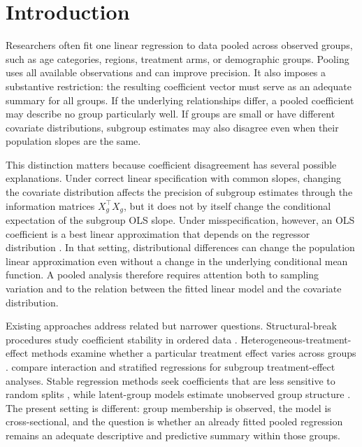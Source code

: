 \section{Introduction}\label{sec:introduction}

Researchers often fit one linear regression to data pooled across observed groups, such as age categories, regions, treatment arms, or demographic groups. Pooling uses all available observations and can improve precision. It also imposes a substantive restriction: the resulting coefficient vector must serve as an adequate summary for all groups. If the underlying relationships differ, a pooled coefficient may describe no group particularly well. If groups are small or have different covariate distributions, subgroup estimates may also disagree even when their population slopes are the same.

This distinction matters because coefficient disagreement has several possible explanations. Under correct linear specification with common slopes, changing the covariate distribution affects the precision of subgroup estimates through the information matrices $X_g^\top X_g$, but it does not by itself change the conditional expectation of the subgroup OLS slope. Under misspecification, however, an OLS coefficient is a best linear approximation that depends on the regressor distribution \citep{berk2019}. In that setting, distributional differences can change the population linear approximation even without a change in the underlying conditional mean function. A pooled analysis therefore requires attention both to sampling variation and to the relation between the fitted linear model and the covariate distribution.

Existing approaches address related but narrower questions. Structural-break procedures study coefficient stability in ordered data \citep{garbade1977,watsenengle1985}. Heterogeneous-treatment-effect methods examine whether a particular treatment effect varies across groups \citep{hte_ref}. \citet{tsoi2026} compare interaction and stratified regressions for subgroup treatment-effect analyses. Stable regression methods seek coefficients that are less sensitive to random splits \citep{bertsimas2020}, while latent-group models estimate unobserved group structure \citep{liu2020}. The present setting is different: group membership is observed, the model is cross-sectional, and the question is whether an already fitted pooled regression remains an adequate descriptive and predictive summary within those groups.

